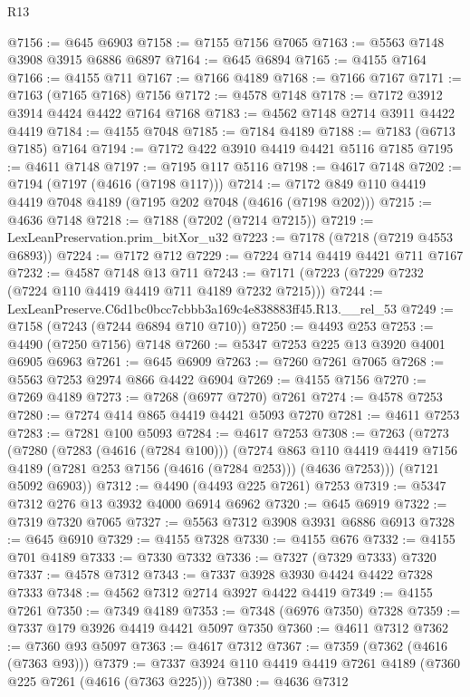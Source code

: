 \begin{lexlean}{R13}
\begin{coremodule}
@7156 := @645 @6903
@7158 := @7155 @7156 @7065
@7163 := @5563 @7148 @3908 @3915 @6886 @6897
@7164 := @645 @6894
@7165 := @4155 @7164
@7166 := @4155 @711
@7167 := @7166 @4189
@7168 := @7166 @7167
@7171 := @7163 (@7165 @7168) @7156
@7172 := @4578 @7148
@7178 := @7172 @3912 @3914 @4424 @4422 @7164 @7168
@7183 := @4562 @7148 @2714 @3911 @4422 @4419
@7184 := @4155 @7048
@7185 := @7184 @4189
@7188 := @7183 (@6713 @7185) @7164
@7194 := @7172 @422 @3910 @4419 @4421 @5116 @7185
@7195 := @4611 @7148
@7197 := @7195 @117 @5116
@7198 := @4617 @7148
@7202 := @7194 (@7197 (@4616 (@7198 @117)))
@7214 := @7172 @849 @110 @4419 @4419 @7048 @4189 (@7195 @202 @7048 (@4616 (@7198 @202)))
@7215 := @4636 @7148
@7218 := @7188 (@7202 (@7214 @7215))
@7219 := LexLeanPreservation.prim_bitXor_u32
@7223 := @7178 (@7218 (@7219 @4553 @6893))
@7224 := @7172 @712
@7229 := @7224 @714 @4419 @4421 @711 @7167
@7232 := @4587 @7148 @13 @711
@7243 := @7171 (@7223 (@7229 @7232 (@7224 @110 @4419 @4419 @711 @4189 @7232 @7215)))
@7244 := LexLeanPreserve.C6d1bc0bcc7cbbb3a169c4e838883ff45.R13.__rel_53
@7249 := @7158 (@7243 (@7244 @6894 @710 @710))
@7250 := @4493 @253
@7253 := @4490 (@7250 @7156) @7148
@7260 := @5347 @7253 @225 @13 @3920 @4001 @6905 @6963
@7261 := @645 @6909
@7263 := @7260 @7261 @7065
@7268 := @5563 @7253 @2974 @866 @4422 @6904
@7269 := @4155 @7156
@7270 := @7269 @4189
@7273 := @7268 (@6977 @7270) @7261
@7274 := @4578 @7253
@7280 := @7274 @414 @865 @4419 @4421 @5093 @7270
@7281 := @4611 @7253
@7283 := @7281 @100 @5093
@7284 := @4617 @7253
@7308 := @7263
    (@7273
      (@7280
        (@7283 (@4616 (@7284 @100)))
        (@7274
          @863
          @110
          @4419
          @4419
          @7156
          @4189
          (@7281 @253 @7156 (@4616 (@7284 @253)))
          (@4636 @7253)))
      (@7121 @5092 @6903))
@7312 := @4490 (@4493 @225 @7261) @7253
@7319 := @5347 @7312 @276 @13 @3932 @4000 @6914 @6962
@7320 := @645 @6919
@7322 := @7319 @7320 @7065
@7327 := @5563 @7312 @3908 @3931 @6886 @6913
@7328 := @645 @6910
@7329 := @4155 @7328
@7330 := @4155 @676
@7332 := @4155 @701 @4189
@7333 := @7330 @7332
@7336 := @7327 (@7329 @7333) @7320
@7337 := @4578 @7312
@7343 := @7337 @3928 @3930 @4424 @4422 @7328 @7333
@7348 := @4562 @7312 @2714 @3927 @4422 @4419
@7349 := @4155 @7261
@7350 := @7349 @4189
@7353 := @7348 (@6976 @7350) @7328
@7359 := @7337 @179 @3926 @4419 @4421 @5097 @7350
@7360 := @4611 @7312
@7362 := @7360 @93 @5097
@7363 := @4617 @7312
@7367 := @7359 (@7362 (@4616 (@7363 @93)))
@7379 := @7337 @3924 @110 @4419 @4419 @7261 @4189 (@7360 @225 @7261 (@4616 (@7363 @225)))
@7380 := @4636 @7312

\end{coremodule}
\end{lexlean}
